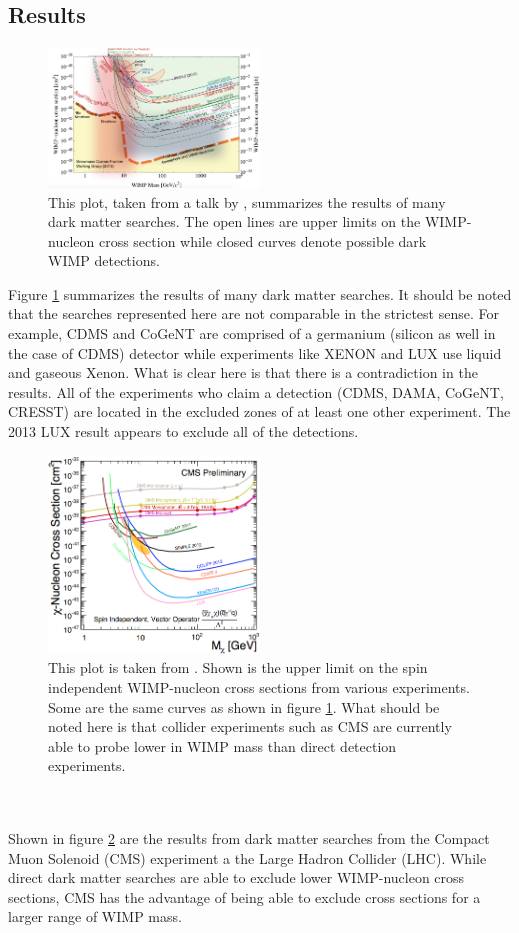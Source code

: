 \documentclass[aps,reprint,prl]{revtex4-1}
\begin{document}
\subsection*{Results}
\begin{figure}[h]
\includegraphics[width=0.5\textwidth]{dmsearchresults}
\caption{This plot, taken from a talk by \cite{feng}, summarizes the results of many dark matter searches.  The open lines are upper limits on the WIMP-nucleon cross section while closed curves denote possible dark WIMP detections.}
\label{fig:res}
\end{figure}
Figure \ref{fig:res} summarizes the results of many dark matter searches.  It should be noted that the searches represented here are not comparable in the strictest sense.  For example, CDMS and CoGeNT are comprised of a germanium (silicon as well in the case of CDMS) detector while experiments like XENON and LUX use liquid and gaseous Xenon.  What is clear here is that there is a contradiction in the results.  All of the experiments who claim a detection (CDMS, DAMA, CoGeNT, CRESST) are located in the excluded zones of at least one other experiment.  The 2013 LUX result appears to exclude all of the detections.
\begin{figure}[h]
\includegraphics[width=0.5\textwidth]{cmsdmresults}
\caption{This plot is taken from \cite{zeynep}.  Shown is the upper limit on the spin independent WIMP-nucleon cross sections from various experiments.  Some are the same curves as shown in figure \ref{fig:res}.  What should be noted here is that collider experiments such as CMS are currently able to probe lower in WIMP mass than direct detection experiments.}
\label{fig:cmsres}
\end{figure}
\\ \\
Shown in figure \ref{fig:cmsres} are the results from dark matter searches from the Compact Muon Solenoid (CMS) experiment a the Large Hadron Collider (LHC).  While direct dark matter searches are able to exclude lower WIMP-nucleon cross sections, CMS has the advantage of being able to exclude cross sections for a larger range of WIMP mass.
\newpage


\end{document}

